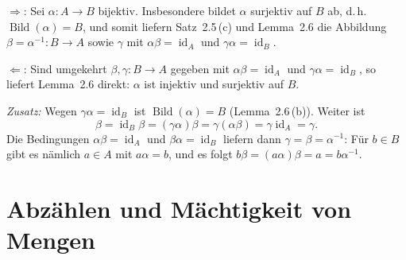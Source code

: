 \documentclass[a4paper]{article}
\makeatletter
\theoremstyle{kurzskript}
\renewenvironment{proof}[1][\proofname]{\par\pushQED{\qed}%
  \normalfont\topsep\medskipamount\relax
  \trivlist\item[\hskip\labelsep\bfseries #1\@addpunct{.}]\ignorespaces}%
  {\popQED\endtrivlist\@endpefalse}
\renewcommand{\proofname}{Beweis}
\makeatother
\begin{document}
\begin{proof}
\glqq$\Rightarrow$\grqq: Sei $\alpha\colon A \to B$ bijektiv. Insbesondere bildet $\alpha$ surjektiv auf $B$ ab, d.\,h.\ $\operatorname{Bild}(\alpha) = B$, und somit liefern Satz~2.5\,(c) und Lemma~2.6 die Abbildung $\beta = \alpha^{-1}\colon B \to A$ sowie $\gamma$ mit $\alpha\beta = \operatorname{id}_A$ und $\gamma\alpha = \operatorname{id}_B$.

\glqq$\Leftarrow$\grqq: Sind umgekehrt $\beta, \gamma\colon B \to A$ gegeben mit $\alpha\beta = \operatorname{id}_A$ und $\gamma\alpha = \operatorname{id}_B$, so liefert Lemma~2.6 direkt: $\alpha$ ist injektiv und surjektiv auf $B$.

\emph{Zusatz:} Wegen $\gamma\alpha = \operatorname{id}_B$ ist $\operatorname{Bild}(\alpha) = B$ (Lemma~2.6\,(b)). Weiter ist
\[
  \beta = \operatorname{id}_B\beta = (\gamma\alpha)\beta = \gamma(\alpha\beta) = \gamma\operatorname{id}_A = \gamma.
\]
Die Bedingungen $\alpha\beta = \operatorname{id}_A$ und $\beta\alpha = \operatorname{id}_B$ liefern dann $\gamma = \beta = \alpha^{-1}$: Für $b \in B$ gibt es nämlich $a \in A$ mit $a\alpha = b$, und es folgt $b\beta = (a\alpha)\beta = a = b\alpha^{-1}$.
\end{proof}

\section{Abzählen und Mächtigkeit von Mengen}
\end{document}
